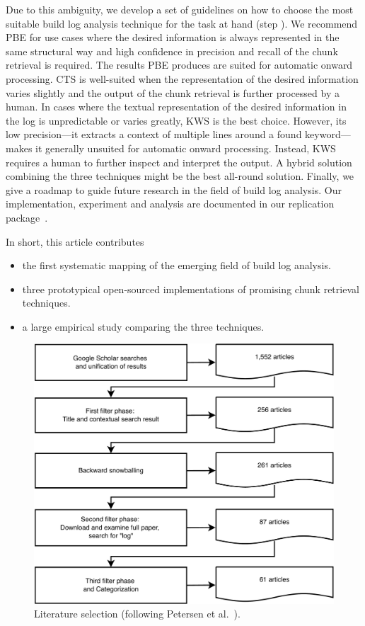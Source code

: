 Due to this ambiguity, we develop a set of guidelines
on how to choose the most suitable build log analysis
technique for the task at hand (step ).
We recommend PBE for use cases where the desired information is always
represented in the same structural way and high confidence in
precision and recall of the chunk retrieval is required.
The results PBE produces are suited for automatic onward processing.
CTS is
well-suited when the representation of the desired information varies
slightly and the output of the chunk retrieval is further processed by
a human.
In cases where the textual representation of the desired
information in the log is unpredictable or varies greatly, KWS is
the best choice.
However, its low precision---it extracts a
context of multiple lines around a found keyword---makes it generally
unsuited for automatic onward processing.
Instead, KWS requires a human
to further inspect and interpret the output.
A hybrid solution combining the three techniques might be the best
all-round solution.
Finally, we give a roadmap to guide future research in the field
of build log analysis.
Our implementation, experiment and analysis are documented
in our replication package~\citep{brandt2020chunk-replication}.

In short, this article contributes
\begin{itemize}
\item the first systematic mapping of the emerging field of build log
analysis.
\item three prototypical open-sourced implementations of
promising chunk retrieval techniques.
\item a large empirical study comparing the three techniques.
\end{itemize}

\begin{figure}[tb]
	\centering
	\includegraphics[width=0.7\columnwidth, clip]{img/lit_mapping_svg2.pdf}
	\caption{Literature selection (following Petersen et
	al.~\citep{petersen2015guidelines}).}
	\label{fig:lit-mapping}
\end{figure}

